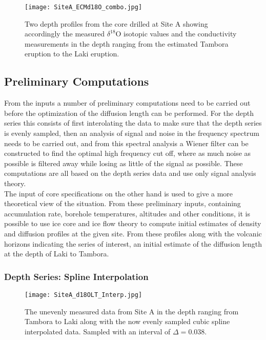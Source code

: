 \documentclass[../../CompleteThesis/Complete_1stDraft.tex]{subfiles}
\begin{document}
\begin{figure}[h]
	\centering
	\texttt{[image: SiteA\_ECMd18O\_combo.jpg]}
	\caption[ECM and d18O data at LT, Site A.]{Two depth profiles from the core drilled at Site A showing accordingly the measured $\delta^{18}$O isotopic values and the conductivity measurements in the depth ranging from the estimated Tambora eruption to the Laki eruption.}	
	\label{fig:SiteA_ECMd18O_combo}
\end{figure}

\subsection[Preliminary Computations]{Preliminary Computations}
From the inputs a number of preliminary computations need to be carried out before the optimization of the diffusion length can be performed. For the depth series this consists of first interolating the data to make sure that the depth series is evenly sampled, then an analysis of signal and noise in the frequency spectrum needs to be carried out, and from this spectral analysis a Wiener filter can be constructed to find the optimal high frequency cut off, where as much noise as possible is filtered away while losing as little of the signal as possible. These computations are all based on the depth series data and use only signal analysis theory.\\
The input of core specifications on the other hand is used to give a more theoretical view of the situation. From these preliminary inputs, containing accumulation rate, borehole temperatures, altitudes and other conditions, it is possible to use ice core and ice flow theory to compute initial estimates of density and diffusion profiles at the given site. From these profiles along with the volcanic horizons indicating the series of interest, an initial estimate of the diffusion length at the depth of Laki to Tambora.
 
\subsubsection[Spline Interpolation]{Depth Series: Spline Interpolation}
\begin{figure}[h]
	\centering
	\texttt{[image: SiteA\_d18OLT\_Interp.jpg]}
	\caption[Measured and interpolated $\delta^{18}$O data, Site A]{The unevenly measured data from Site A in the depth ranging from Tambora to Laki along with the now evenly sampled cubic spline interpolated data. Sampled with an interval of $\Delta = 0.038$.}
	\label{fig:SiteA_d18OLT_Interp}
\end{figure}
\end{document}
